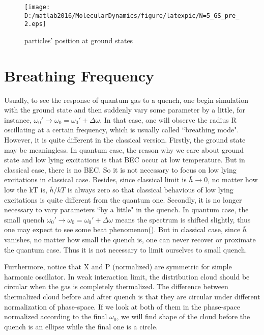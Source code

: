 \documentclass[aps,pre,twocolumn
,groupedaddress]{revtex4-1}
\begin{document}
\begin{figure}[hbtp]
\centering
\texttt{[image: D:/matlab2016/MolecularDynamics/figure/latexpic/N=5\_GS\_pre\_2.eps]}
\caption{particles' position at ground states }
\label{fig:GS1}
\end{figure}



\section{Breathing Frequency}
Usually, to see the response of quantum gas to a quench, one begin simulation with the ground state and then suddenly vary some parameter by a little, for instance, $\omega_0'\rightarrow\omega_0=\omega_0'+\Delta\omega$. In that case, one will observe the radius R oscillating at a certain frequency, which is usually called ``breathing mode".
However, it is quite different in the classical version. Firstly, the ground state may be meaningless. In quantum case, the reason why we care about ground state and low lying excitations is that BEC occur at low temperature. But in classical case, there is no BEC. So it is not necessary to focus on low lying excitations in classical case. Besides, since classical limit is $\bar{h}\rightarrow 0$, no matter how low the kT is, $\bar{h}/kT$ is always zero so that classical behavious of low lying excitations is quite different from the quantum one. Secondly, it is no longer necessary to vary parameters ``by a little" in the quench. In quantum case, the small quench $\omega_0'\rightarrow\omega_0=\omega_0'+\Delta\omega$ means the spectrum is shifted slightly, thus one may expect to see some beat phenomenon({\color{red}{?}}). But in classical case, since $\bar{h}$ vanishes, no matter how small the quench is, one can never recover or proximate the quantum case. Thus it is not necessary to limit ourselves to small quench. 

Furthermore, notice that X and P (normalized) are symmetric for simple harmonic oscillator. In weak interaction limit, the distribution cloud should be circular when the gas is completely thermalized. The difference between thermalized cloud before and after quench is that they are circular under different normalization of phase-space. If we look at both of them in the phase-space normalized according to the final $\omega_0$, we will find shape of the cloud before the quench is an ellipse while the final one is a circle.
\end{document}
